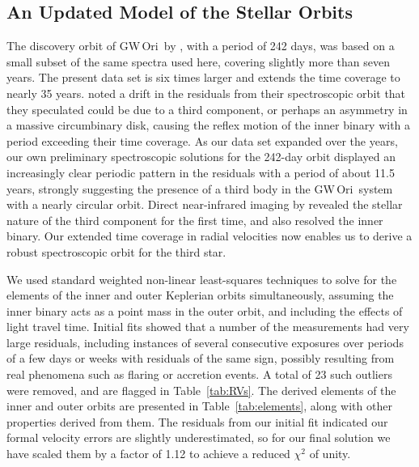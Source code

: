 \documentclass[twocolumn]{aastex61}
\newcommand{\gw}{GW\,Ori}
\begin{document}
\subsection{An Updated Model of the Stellar Orbits} \label{sec:orbit}

The discovery orbit of \gw\ by \cite{mathieu91}, with a period of
242 days, was based on a small subset of the same spectra used here,
covering slightly more than seven years. The present data set is six
times larger and extends the time coverage to nearly 35 years.
\cite{mathieu91} noted a drift in the residuals from their
spectroscopic orbit that they speculated could be due to a third
component, or perhaps an asymmetry in a massive circumbinary disk,
causing the reflex motion of the inner binary with a period exceeding
their time coverage. As our data set expanded over the years, our own
preliminary spectroscopic solutions for the 242-day orbit displayed an
increasingly clear periodic pattern in the residuals with a period of
about 11.5 years, strongly suggesting the presence of a third body in
the \gw\ system with a nearly circular orbit. Direct near-infrared
imaging by \cite{berger11} revealed the stellar nature of the third
component for the first time, and also resolved the inner binary.  Our
extended time coverage in radial velocities now enables us to derive a
robust spectroscopic orbit for the third star.

We used standard weighted non-linear least-squares techniques
\citep[e.g.,][]{press92} to solve for the elements of the inner and
outer Keplerian orbits simultaneously, assuming the inner binary acts
as a point mass in the outer orbit, and including the effects of light
travel time. Initial fits showed that a number of the measurements had
very large residuals, including instances of several consecutive
exposures over periods of a few days or weeks with residuals of the
same sign, possibly resulting from real phenomena such as flaring or
accretion events. A total of 23 such outliers were removed, and are
flagged in Table~\ref{tab:RVs}. The derived elements of the inner and
outer orbits are presented in Table~\ref{tab:elements}, along with
other properties derived from them. The residuals from our initial fit
indicated our formal velocity errors are slightly underestimated, so
for our final solution we have scaled them by a factor of 1.12 to
achieve a reduced $\chi^2$ of unity.
\end{document}
